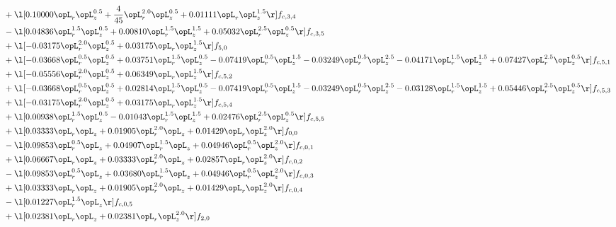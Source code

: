 \begin{alignat}{2}
& + \l[  0.10000 \opL_r \opL_z^{0.5} + \frac{4}{45} \opL_r^{2.0} \opL_z^{0.5} +  0.01111 \opL_r \opL_z^{1.5}  \r] f_{c,3,4} \nonumber \\ 
& - \l[  0.04836 \opL_r^{1.5} \opL_z^{0.5} +  0.00810 \opL_r^{1.5} \opL_z^{1.5} +  0.05032 \opL_r^{2.5} \opL_z^{0.5}  \r] f_{c,3,5} \nonumber \\ 
& + \l[  -0.03175 \opL_r^{2.0} \opL_z^{0.5} +  0.03175 \opL_r \opL_z^{1.5}  \r] f_{5,0} \nonumber \\ 
& + \l[  -0.03668 \opL_r^{0.5} \opL_z^{0.5} +  0.03751 \opL_r^{1.5} \opL_z^{0.5}   -0.07419 \opL_r^{0.5} \opL_z^{1.5}   -0.03249 \opL_r^{0.5} \opL_z^{2.5}   -0.04171 \opL_r^{1.5} \opL_z^{1.5} +  0.07427 \opL_r^{2.5} \opL_z^{0.5}  \r] f_{c,5,1} \nonumber \\ 
& + \l[  -0.05556 \opL_r^{2.0} \opL_z^{0.5} +  0.06349 \opL_r \opL_z^{1.5}  \r] f_{c,5,2} \nonumber \\ 
& + \l[  -0.03668 \opL_r^{0.5} \opL_z^{0.5} +  0.02814 \opL_r^{1.5} \opL_z^{0.5}   -0.07419 \opL_r^{0.5} \opL_z^{1.5}   -0.03249 \opL_r^{0.5} \opL_z^{2.5}   -0.03128 \opL_r^{1.5} \opL_z^{1.5} +  0.05446 \opL_r^{2.5} \opL_z^{0.5}  \r] f_{c,5,3} \nonumber \\ 
& + \l[  -0.03175 \opL_r^{2.0} \opL_z^{0.5} +  0.03175 \opL_r \opL_z^{1.5}  \r] f_{c,5,4} \nonumber \\ 
& + \l[  0.00938 \opL_r^{1.5} \opL_z^{0.5}   -0.01043 \opL_r^{1.5} \opL_z^{1.5} +  0.02476 \opL_r^{2.5} \opL_z^{0.5}  \r] f_{c,5,5} \nonumber \\ 
& + \l[  0.03333 \opL_r \opL_z +  0.01905 \opL_r^{2.0} \opL_z +  0.01429 \opL_r \opL_z^{2.0}  \r] f_{0,0} \nonumber \\ 
& - \l[  0.09853 \opL_r^{0.5} \opL_z +  0.04907 \opL_r^{1.5} \opL_z +  0.04946 \opL_r^{0.5} \opL_z^{2.0}  \r] f_{c,0,1} \nonumber \\ 
& + \l[  0.06667 \opL_r \opL_z +  0.03333 \opL_r^{2.0} \opL_z +  0.02857 \opL_r \opL_z^{2.0}  \r] f_{c,0,2} \nonumber \\ 
& - \l[  0.09853 \opL_r^{0.5} \opL_z +  0.03680 \opL_r^{1.5} \opL_z +  0.04946 \opL_r^{0.5} \opL_z^{2.0}  \r] f_{c,0,3} \nonumber \\ 
& + \l[  0.03333 \opL_r \opL_z +  0.01905 \opL_r^{2.0} \opL_z +  0.01429 \opL_r \opL_z^{2.0}  \r] f_{c,0,4} \nonumber \\ 
& - \l[  0.01227 \opL_r^{1.5} \opL_z  \r] f_{c,0,5} \nonumber \\ 
& + \l[  0.02381 \opL_r \opL_z +  0.02381 \opL_r \opL_z^{2.0}  \r] f_{2,0} \nonumber \\ 

\end{alignat}
